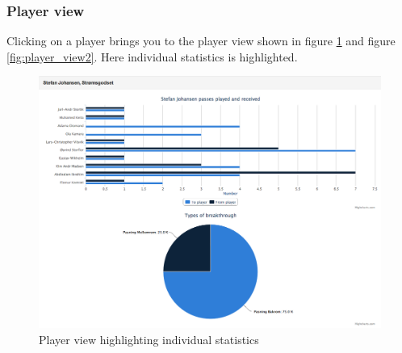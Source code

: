 \subsubsection{Player view}

Clicking on a player brings you to the player view shown in figure \ref{fig:player_view1} and figure \ref{fig:player_view2}. Here individual statistics is highlighted. 

\begin{figure}[ht!]
\centering
\includegraphics[width=1\textwidth]{images/general/player_view1.png}
\caption{Player view highlighting individual statistics}
\label{fig:player_view1}
\end{figure}

